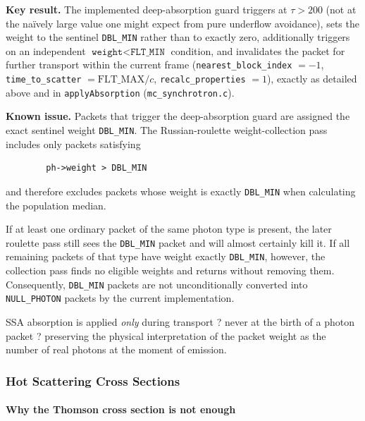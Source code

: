 \documentclass[12pt,a4paper]{article}
\newcommand{\code}[1]{\texttt{#1}}
\newenvironment{keyresult}{%
	\begin{framed}\noindent\textbf{Key result.}\quad}
	{\end{framed}}
\newenvironment{knownissue}{%
	\begin{framed}\noindent\textbf{Known issue.}\quad}
	{\end{framed}}
\begin{document}
\begin{keyresult}
	The implemented deep-absorption guard triggers at $\tau > 200$ (not at
	the na\"ively large value one might expect from pure underflow
	avoidance), sets the weight to the sentinel \code{DBL\_MIN} rather than
	to exactly zero, additionally triggers on an independent
	$\code{weight}<\code{FLT\_MIN}$ condition, and invalidates the packet for
	further transport within the current frame (\code{nearest\_block\_index}
	$=-1$, \code{time\_to\_scatter} $=\mathrm{FLT\_MAX}/c$,
	\code{recalc\_properties} $=1$), exactly as detailed above and in
	\code{applyAbsorption} (\code{mc\_synchrotron.c}).
\end{keyresult}

\begin{knownissue}
	Packets that trigger the deep-absorption guard are assigned the exact
	sentinel weight \code{DBL\_MIN}. The Russian-roulette weight-collection
	pass includes only packets satisfying
	\begin{verbatim}
		ph->weight > DBL_MIN
	\end{verbatim}
	and therefore excludes packets whose weight is exactly
	\code{DBL\_MIN} when calculating the population median.
	
	If at least one ordinary packet of the same photon type is present, the
	later roulette pass still sees the \code{DBL\_MIN} packet and will almost
	certainly kill it. If all remaining packets of that type have weight
	exactly \code{DBL\_MIN}, however, the collection pass finds no eligible
	weights and returns without removing them. Consequently,
	\code{DBL\_MIN} packets are not unconditionally converted into
	\code{NULL\_PHOTON} packets by the current implementation.
\end{knownissue}

SSA absorption is applied \emph{only} during transport ? never at the
birth of a photon packet ? preserving the physical interpretation of the
packet weight as the number of real photons at the moment of emission.

\subsubsection{Hot Scattering Cross Sections}
\label{sec:hot_xsection}

\paragraph{Why the Thomson cross section is not enough}
\end{document}
